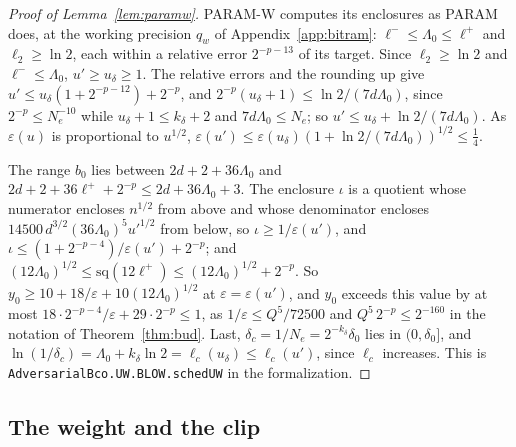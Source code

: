 \documentclass[11pt]{amsart}
\theoremstyle{definition}
\numberwithin{equation}{section}
\begin{document}
\begin{proof}[Proof of Lemma~\ref{lem:paramw}]
PARAM-W computes its enclosures as PARAM does, at the working precision $q_w$ of Appendix~\ref{app:bitram}: $\ell^-\le\Lambda_0\le\ell^+$ and $\ell_2\ge\ln2$, each within a relative error $2^{-p-13}$ of its target. Since $\ell_2\ge\ln2$ and $\ell^-\le\Lambda_0$, $u'\ge u_\delta\ge1$. The relative errors and the rounding up give $u'\le u_\delta(1+2^{-p-12})+2^{-p}$, and $2^{-p}(u_\delta+1)\le\ln2/(7d\Lambda_0)$, since $2^{-p}\le N_e^{-10}$ while $u_\delta+1\le k_\delta+2$ and $7d\Lambda_0\le N_e$; so $u'\le u_\delta+\ln2/(7d\Lambda_0)$. As $\varepsilon(u)$ is proportional to $u^{1/2}$, $\varepsilon(u')\le\varepsilon(u_\delta)(1+\ln2/(7d\Lambda_0))^{1/2}\le\frac14$.

The range $b_0$ lies between $2d+2+36\Lambda_0$ and $2d+2+36\ell^++2^{-p}\le2d+36\Lambda_0+3$. The enclosure $\iota$ is a quotient whose numerator encloses $n^{1/2}$ from above and whose denominator encloses $14500\,d^{3/2}(36\Lambda_0)^5u'^{1/2}$ from below, so $\iota\ge1/\varepsilon(u')$, and $\iota\le(1+2^{-p-4})/\varepsilon(u')+2^{-p}$; and $(12\Lambda_0)^{1/2}\le\mathrm{sq}(12\ell^+)\le(12\Lambda_0)^{1/2}+2^{-p}$. So $y_0\ge10+18/\varepsilon+10(12\Lambda_0)^{1/2}$ at $\varepsilon=\varepsilon(u')$, and $y_0$ exceeds this value by at most $18\cdot2^{-p-4}/\varepsilon+29\cdot2^{-p}\le1$, as $1/\varepsilon\le Q^5/72500$ and $Q^5\,2^{-p}\le2^{-160}$ in the notation of Theorem~\ref{thm:bud}. Last, $\delta_c=1/N_e=2^{-k_\delta}\delta_0$ lies in $(0,\delta_0]$, and $\ln(1/\delta_c)=\Lambda_0+k_\delta\ln2=\ell_c(u_\delta)\le\ell_c(u')$, since $\ell_c$ increases. This is \texttt{AdversarialBco.\allowbreak UW.\allowbreak BLOW.\allowbreak schedUW} in the formalization.
\end{proof}

\subsection*{The weight and the clip}
\end{document}

